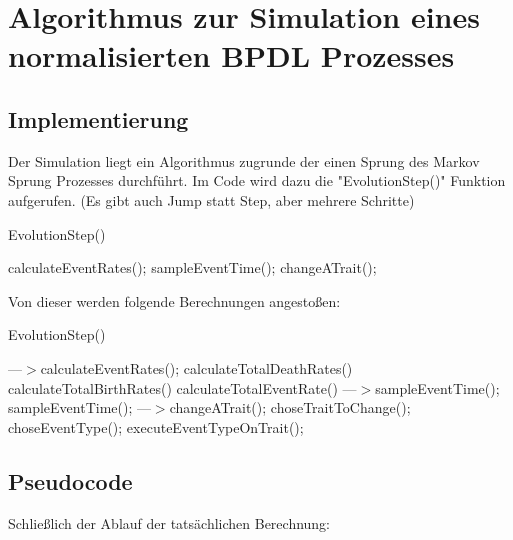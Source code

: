 \documentclass[11pt, a4paper, german]{article}
\begin{document}
\section{Algorithmus zur Simulation eines normalisierten BPDL Prozesses}
	\subsection{Implementierung}
	Der Simulation liegt ein Algorithmus zugrunde der einen Sprung des Markov Sprung Prozesses durchführt. Im Code wird dazu die "{}EvolutionStep()"{} Funktion aufgerufen. (Es gibt auch Jump statt Step, aber mehrere Schritte)
	\begin{algorithm}[H]
		\caption{EvolutionStep()}
		\begin{algorithmic}[1]
			\STATE calculateEventRates();
			\STATE sampleEventTime();
			\STATE changeATrait();
		\end{algorithmic}
	\end{algorithm}
	
	Von dieser werden folgende Berechnungen angestoßen:
		
	\begin{algorithm}[H]
		\caption{EvolutionStep()}
		\begin{algorithmic}[1]
			\STATE ---$>$calculateEventRates();
			\STATE calculateTotalDeathRates()
			\STATE calculateTotalBirthRates()
			\STATE calculateTotalEventRate()
			\STATE ---$>$sampleEventTime();
			\STATE sampleEventTime();
			\STATE ---$>$changeATrait();
			\STATE choseTraitToChange();
			\STATE choseEventType();
			\STATE executeEventTypeOnTrait();
		\end{algorithmic}
	\end{algorithm}
	
	\subsection{Pseudocode}
	Schließlich der Ablauf der tatsächlichen Berechnung:
	
\end{document}
